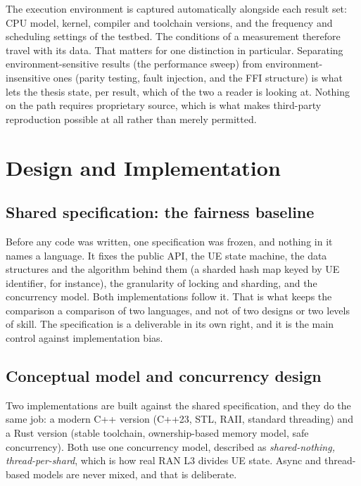 \documentclass[english,oneside,a4paper,censored,csm,software-track-2020]{HYthesisML}
\begin{document}
The execution environment is captured automatically alongside each result set: CPU model,
kernel, compiler and toolchain versions, and the frequency and scheduling settings of the
testbed. The conditions of a measurement therefore travel with its data. That matters for one
distinction in particular. Separating environment-sensitive results (the performance sweep) from
environment-insensitive ones (parity testing, fault injection, and the FFI structure) is what
lets the thesis state, per result, which of the two a reader is looking at. Nothing on the path
requires proprietary source, which is what makes third-party reproduction possible at all rather
than merely permitted.

\chapter{Design and Implementation\label{chapter:design}}

\section{Shared specification: the fairness baseline}
\label{sec:fairness}
Before any code was written, one specification was frozen, and nothing in it names a language.
It fixes the public API, the UE state machine, the data structures and the algorithm behind them
(a sharded hash map keyed by UE identifier, for instance), the granularity of locking and
sharding, and the concurrency model. Both implementations follow it. That is what keeps the
comparison a comparison of two languages, and not of two designs or two levels of skill. The
specification is a deliverable in its own right, and it is the main control against
implementation bias.

\section{Conceptual model and concurrency design}\label{sec:concurrency}
Two implementations are built against the shared specification, and they do the same job: a
modern C++ version (C++23, STL, RAII, standard threading) and a Rust version (stable toolchain,
ownership-based memory model, safe concurrency). Both use one concurrency model, described as
\emph{shared-nothing, thread-per-shard}, which is how real RAN L3 divides UE state. Async and
thread-based models are never mixed, and that is deliberate.
\end{document}

